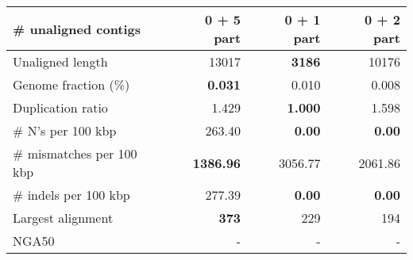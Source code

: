 \documentclass[12pt,a4paper]{article}
\begin{document}
\begin{table}[ht]
\begin{center}
\begin{tabular}{|l*{3}{|r}|}
\# unaligned contigs & 0 + 5 part & {\bf 0 + 1 part} & 0 + 2 part \\ \hline
Unaligned length & 13017 & {\bf 3186} & 10176 \\ \hline
Genome fraction (\%) & {\bf 0.031} & 0.010 & 0.008 \\ \hline
Duplication ratio & 1.429 & {\bf 1.000} & 1.598 \\ \hline
\# N's per 100 kbp & 263.40 & {\bf 0.00} & {\bf 0.00} \\ \hline
\# mismatches per 100 kbp & {\bf 1386.96} & 3056.77 & 2061.86 \\ \hline
\# indels per 100 kbp & 277.39 & {\bf 0.00} & {\bf 0.00} \\ \hline
Largest alignment & {\bf 373} & 229 & 194 \\ \hline
NGA50 & - & - & - \\ \hline
\end{tabular}
\end{center}
\end{table}
\end{document}
